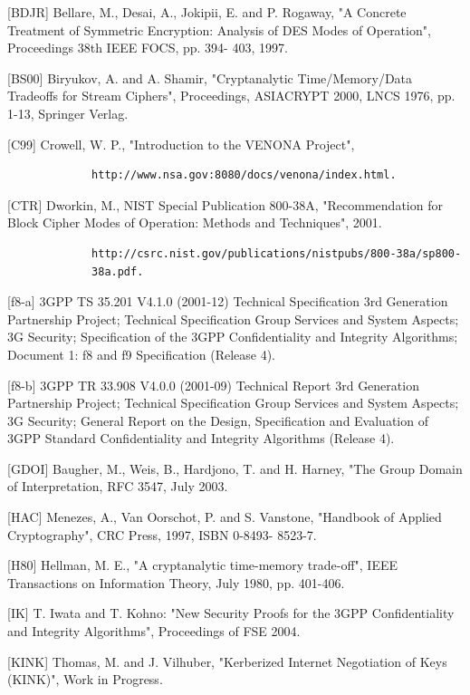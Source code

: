 \documentclass{article}
\begin{document}
[BDJR]    Bellare, M., Desai, A., Jokipii, E. and P. Rogaway, "A Concrete Treatment of Symmetric Encryption: Analysis of DES Modes of Operation", Proceedings 38th IEEE FOCS, pp. 394- 403, 1997.

[BS00]    Biryukov, A. and A. Shamir, "Cryptanalytic Time/Memory/Data Tradeoffs for Stream Ciphers", Proceedings, ASIACRYPT 2000, LNCS 1976, pp. 1-13, Springer Verlag.

[C99]     Crowell, W. P., "Introduction to the VENONA Project",

\begin{verbatim}
             http://www.nsa.gov:8080/docs/venona/index.html.
\end{verbatim}

[CTR]     Dworkin, M., NIST Special Publication 800-38A, "Recommendation for Block Cipher Modes of Operation: Methods and Techniques", 2001.

\begin{verbatim}
             http://csrc.nist.gov/publications/nistpubs/800-38a/sp800-
             38a.pdf.
\end{verbatim}

[f8-a]    3GPP TS 35.201 V4.1.0 (2001-12) Technical Specification 3rd Generation Partnership Project; Technical Specification Group Services and System Aspects; 3G Security; Specification of the 3GPP Confidentiality and Integrity Algorithms; Document 1: f8 and f9 Specification (Release 4).

[f8-b]    3GPP TR 33.908 V4.0.0 (2001-09) Technical Report 3rd Generation Partnership Project; Technical Specification Group Services and System Aspects; 3G Security; General Report on the Design, Specification and Evaluation of 3GPP Standard Confidentiality and Integrity Algorithms (Release 4).

[GDOI]    Baugher, M., Weis, B., Hardjono, T. and H. Harney, "The Group Domain of Interpretation, RFC 3547, July 2003.

[HAC]     Menezes, A., Van Oorschot, P. and  S. Vanstone, "Handbook of Applied Cryptography", CRC Press, 1997, ISBN 0-8493- 8523-7.

[H80]     Hellman, M. E., "A cryptanalytic time-memory trade-off", IEEE Transactions on Information Theory, July 1980, pp. 401-406.

[IK]      T. Iwata and T. Kohno: "New Security Proofs for the 3GPP Confidentiality and Integrity Algorithms", Proceedings of FSE 2004.

[KINK]    Thomas, M. and J. Vilhuber, "Kerberized Internet Negotiation of Keys (KINK)", Work in Progress.
\end{document}
